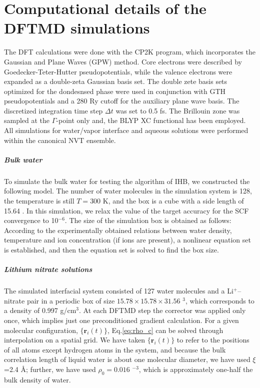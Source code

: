 \chapter{Computational details of the DFTMD simulations}\label{computational_detail}
The DFT calculations were done with the CP2K program\cite{CP2K,Kuehne2020}, which incorporates the Gaussian and Plane Waves (GPW) method\cite{GL99}. 
Core electrons were described by Goedecker-Teter-Hutter pseudopotentials\cite{MK05}, while the valence electrons were expanded as a double-zeta Gaussian basis set.
The double zete basis sets optimized for the dondesnsed phase\cite{VandeVondele2007} were used in conjunction with GTH pseudopotentials\cite{Goedecker1996} 
and a 280 Ry cutoff for the auxiliary plane wave basis.
The discretized integration time step $\Delta t$ was set to 0.5 fs. 
The Brillouin zone was sampled at the $\Gamma$-point only and, the BLYP XC functional has been employed.
All simulations for water/vapor interface and aqueous solutions were performed within the canonical NVT ensemble. 
%
\paragraph{Bulk water}\label{DETAILS_NEAT_WATER}
To simulate the bulk water for testing the algorithm of IHB, we constructed the following model. 
The number of water molecules in the simulation system is 128, 
the temperature is still $T=300$ K, and the box is a cube with a side length of 15.64 \A. 
In this simulation, we relax the value of the target accuracy for the SCF convergence to 10$^{-6}$. 
The size of the simulation box is obtained as follows: 
According to the experimentally obtained relations between water density, temperature and ion concentration (if ions are present), 
a nonlinear equation set is established, and then the equation set is solved to find the box size.

\paragraph{Lithium nitrate solutions}\label{DETAILS_LINO3}
The simulated interfacial system consisted of 127 water molecules and a Li$^+$--nitrate pair in a periodic
box of size $15.78 \times 15.78 \times 31.56$ \A$^3$, which corresponds to
a density of 0.997 g/cm$^3$. 
At each DFTMD step the corrector was applied only once, which implies just one preconditioned gradient calculation. 
For a given molecular configuration, $\{\mathbf{r}_i (t)\}$, Eq.\thinspace\ref{eq:rho_c} can be
solved through interpolation on a spatial grid.\cite{Willard2010} 
We have taken $\{\mathbf{r}_i (t)\}$ to refer to the positions of all
atoms except hydrogen atoms in the system, and because the bulk correlation length of
liquid water is about one molecular diameter, we have used $\xi$ 
=2.4 \AA; further, we have used $\rho_0= 0.016$ \A$^{-3}$, which is
approximately one-half the bulk density of water. 

